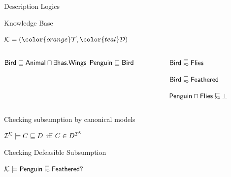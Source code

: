 \documentclass[10pt]{beamer}
\begin{document}
%
%

\begin{frame}[fragile]{Description Logics}

    \Large{
      Knowledge Base
    }

    \Large{
      $\Kmc = ({\color{orange}\Tmc}, {\color{teal}\Dmc})$
    }


    \vspace{1mm}

\begin{columns}

\begin{column}{.5\textwidth}
    

    \large{\color{orange}$\mathsf{Bird} \sqsubseteq \mathsf{Animal} \sqcap \exists \mathsf{has}.\mathsf{Wings}$
    $\mathsf{Penguin} \sqsubseteq \mathsf{Bird}$}
\end{column}

\begin{column}{.5\textwidth}
    
    \large{ \color{teal} $\dlFont{Bird} \definc \dlFont{Flies}$

    $\dlFont{Bird} \definc \dlFont{Feathered}$

    $\dlFont{Penguin} \sqcap \dlFont{Flies} \definc \bot$}
\end{column}

\end{columns}

\vspace{1mm}

\pause
\Large{Checking subsumption by canonical models}

\large{
$\mathcal{I}^{\mathcal{K}} \models C \sqsubseteq D$ iff $C \in D^{\mathcal{I}^{\mathcal{K}}}$
}

\pause
  \vspace{0.5cm}
  \Large{Checking Defeasible Subsumption}

\vspace{1mm}
\large{
$\Kmc \models \dlFont{Penguin} \definc \dlFont{Feathered}?$
}



\end{frame}

%
%
\end{document}

